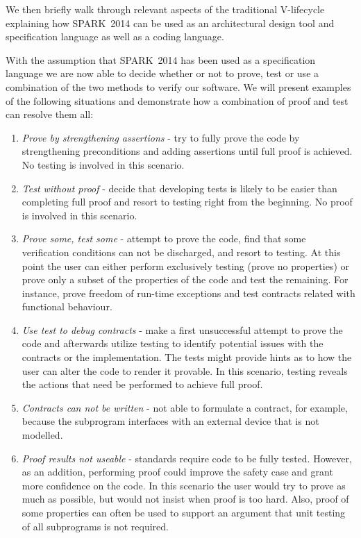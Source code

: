 \documentclass[paperletter]{sig-alternate-2013}
\newcommand{\newspark}{SPARK~2014\xspace}
\begin{document}
We then briefly walk through relevant aspects of the traditional
V-lifecycle explaining how \newspark can be used as an architectural
design tool and specification language as well as a coding language.

With the assumption that \newspark has been used as a specification
language we are now able to decide whether or not to prove, test or
use a combination of the two methods to verify our software.  We will
present examples of the following situations and demonstrate how a
combination of proof and test can resolve them all:
\begin {enumerate}
\item \emph{Prove by strengthening assertions} - try to fully prove
  the code by strengthening preconditions and adding assertions until
  full proof is achieved. No testing is involved in this scenario.

\item \emph{Test without proof} - decide that developing tests is
  likely to be easier than completing full proof and resort to testing
  right from the beginning. No proof is involved in this scenario.

\item \emph{Prove some, test some} - attempt to prove the code, find
  that some verification conditions can not be discharged, and resort
  to testing. At this point the user can either perform exclusively
  testing (prove no properties) or prove only a subset of the
  properties of the code and test the remaining. For instance, prove
  freedom of run-time exceptions and test contracts related with
  functional behaviour.

\item \emph{Use test to debug contracts} - make a first unsuccessful
  attempt to prove the code and afterwards utilize testing to identify
  potential issues with the contracts or the implementation. The tests
  might provide hints as to how the user can alter the code to render
  it provable. In this scenario, testing reveals the actions that need
  be performed to achieve full proof.

\item \emph{Contracts can not be written} - not able to formulate a
  contract, for example, because the subprogram interfaces with an
  external device that is not modelled.

\item \emph{Proof results not useable} - standards require code to
  be fully tested. However, as an addition, performing proof could
  improve the safety case and grant more confidence on the code. In
  this scenario the user would try to prove as much as possible, but
  would not insist when proof is too hard. Also, proof of some
  properties can often be used to support an argument that
  unit testing of all subprograms is not required.

\end{enumerate}
\end{document}
